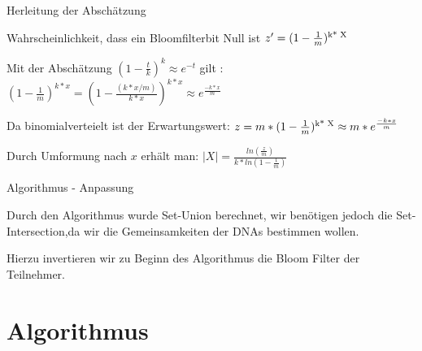 \documentclass{beamer}
\begin{document}
	
	
	
	\begin{frame}{Herleitung der Abschätzung}
		
		\begin{arrowlist}
			\item Wahrscheinlichkeit, dass ein Bloomfilterbit Null ist $ z' = (1 -\frac{1}{m})\textsuperscript{k* X} $
			\newline
			\item Mit der Abschätzung $ (1 -\frac{t}{k})^{k} \approx e^{-t} $ gilt :
			\newline
			\newline
			$ (1-\frac{1}{m}) ^{k*x} = (1-\frac{(k*x/m)}{k*x})^{k*x} \approx e^{\frac{-k*x}{m}}$ 
			\newline
			\item Da binomialverteielt ist der Erwartungswert:
			$ z = m*(1 -\frac{1}{m})\textsuperscript{k* X}\approx m*e^{\frac{-k*x}{m}} $ 
			\newline
			\item Durch Umformung nach $ x $ erhält man:  $ |X| = \frac{ln( \frac{z}{m})}{k* ln(1- \frac{1}{m})}$
		\end{arrowlist}
		
		
	\end{frame}
	
	
	\begin{frame}{Algorithmus - Anpassung} 
		\begin{arrowlist}
			\item Durch den Algorithmus wurde Set-Union berechnet, wir benötigen jedoch die Set-Intersection,da wir die Gemeinsamkeiten der DNAs bestimmen wollen.
			\item Hierzu invertieren wir zu Beginn des Algorithmus die Bloom Filter der Teilnehmer.
		\end{arrowlist}
	\end{frame}





\section{Algorithmus}
\end{document}

